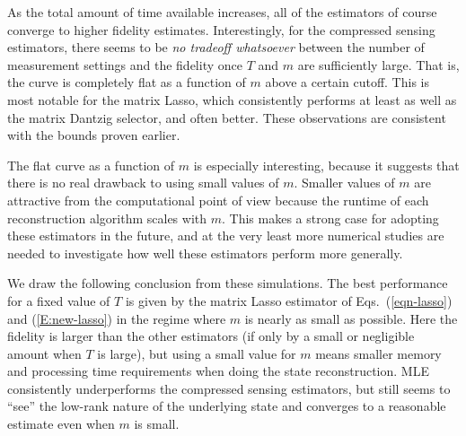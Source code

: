 As the total amount of time available increases, all of the estimators of course converge to higher fidelity estimates. Interestingly, for the compressed sensing estimators, there seems to be \emph{no tradeoff whatsoever} between the number of measurement settings and the fidelity once $T$ and $m$ are sufficiently large. That is, the curve is completely flat as a function of $m$ above a certain cutoff. This is most notable for the matrix Lasso, which consistently performs at least as well as the matrix Dantzig selector, and often better. These observations are consistent with the bounds proven earlier. 

The flat curve as a function of $m$ is especially interesting, because it suggests that there is no real drawback to using small values of $m$. Smaller values of $m$ are attractive from the computational point of view because the runtime of each reconstruction algorithm scales with $m$. This makes a strong case for adopting these estimators in the future, and at the very least more numerical studies are needed to investigate how well these estimators perform more generally.

We draw the following conclusion from these simulations. The best performance for a fixed value of $T$ is given by the matrix Lasso estimator of Eqs.~(\ref{eqn-lasso}) and (\ref{E:new-lasso}) in the regime where $m$ is nearly as small as possible. Here the fidelity is larger than the other estimators (if only by a small or negligible amount when $T$ is large), but using a small value for $m$ means smaller memory and processing time requirements when doing the state reconstruction. MLE consistently underperforms the compressed sensing estimators, but still seems to ``see'' the low-rank nature of the underlying state and converges to a reasonable estimate even when $m$ is small. 
